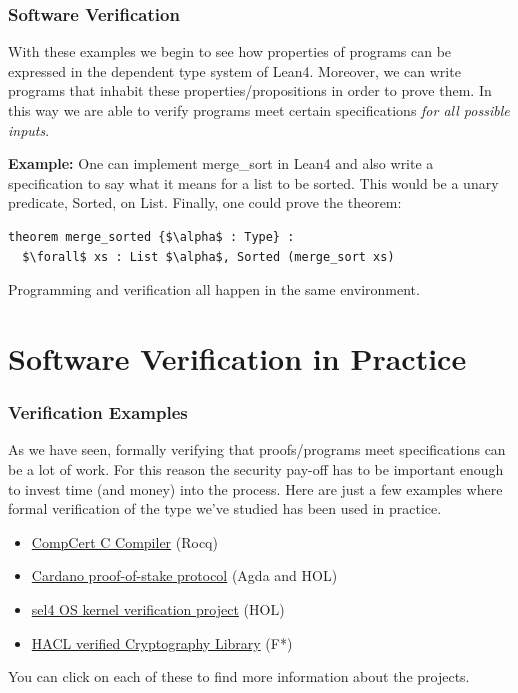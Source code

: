 \documentclass{beamer}
\theoremstyle{indentDefn} \newtheorem{defn}[]{Definition}
\begin{document}
\begin{frame}[fragile]
	\frametitle{Software Verification}
	
	With these examples we begin to see how properties of programs can be expressed in the dependent type system of Lean4. Moreover, we can write programs that inhabit these properties/propositions in order to prove them. In this way we are able to verify programs meet certain specifications \emph{for all possible inputs}.
	
	{\bf Example:} One can implement merge\_sort in Lean4 and also write a specification to say what it means for a list to be sorted. This would be a unary predicate, Sorted, on List. Finally, one could prove the theorem: 
\begin{lstlisting}[language=Lean]	
theorem merge_sorted {$\alpha$ : Type} :
  $\forall$ xs : List $\alpha$, Sorted (merge_sort xs)
\end{lstlisting}

\vspace{15mm}

Programming and verification all happen in the same environment.
	
\end{frame}

\section{Software Verification in Practice}


\begin{frame}
	\frametitle{Verification Examples}	
	
As we have seen, formally verifying that proofs/programs meet specifications can be a lot of work. For this reason the security pay-off has to be important enough to invest time (and money) into the process. Here are just a few examples where formal verification of the type we've studied has been used in practice.
	
	\begin{itemize}
		\item[] \href{https://github.com/AbsInt/CompCert}{CompCert C Compiler} (Rocq)
		\item[] \href{https://leios.cardano-scaling.org/formal-spec/}{Cardano proof-of-stake protocol} (Agda and HOL)
		\item[] \href{https://sel4.systems/}{sel4 OS kernel verification project} (HOL)
		\item[] \href{https://github.com/hacl-star/hacl-star}{HACL verified Cryptography Library} (F*)
	\end{itemize}
	
	You can click on each of these to find more information about the projects.

\end{frame}
\end{document}
